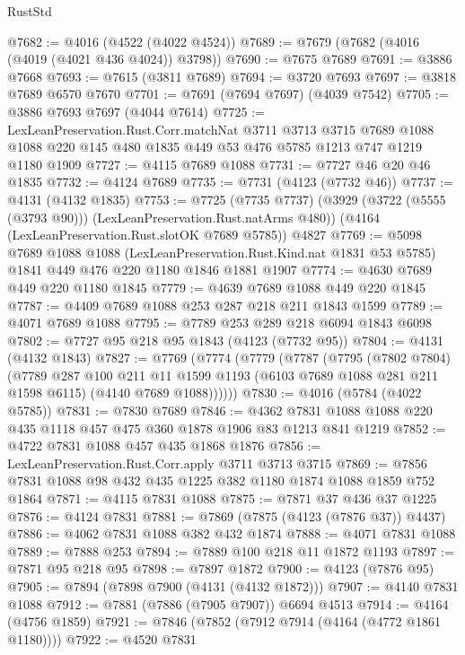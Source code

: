 \begin{lexlean}{RustStd}
\begin{coremodule}
@7682 := @4016 (@4522 (@4022 @4524))
@7689 := @7679 (@7682 (@4016 (@4019 (@4021 @436 @4024)) @3798))
@7690 := @7675 @7689
@7691 := @3886 @7668
@7693 := @7615 (@3811 @7689)
@7694 := @3720 @7693
@7697 := @3818 @7689 @6570 @7670
@7701 := @7691 (@7694 @7697) (@4039 @7542)
@7705 := @3886 @7693 @7697 (@4044 @7614)
@7725 := LexLeanPreservation.Rust.Corr.matchNat
    @3711
    @3713
    @3715
    @7689
    @1088
    @1088
    @220
    @145
    @480
    @1835
    @449
    @53
    @476
    @5785
    @1213
    @747
    @1219
    @1180
    @1909
@7727 := @4115 @7689 @1088
@7731 := @7727 @46 @20 @46 @1835
@7732 := @4124 @7689
@7735 := @7731 (@4123 (@7732 @46))
@7737 := @4131 (@4132 @1835)
@7753 := @7725
    (@7735 @7737)
    (@3929 (@3722 (@5555 (@3793 @90))) (LexLeanPreservation.Rust.natArms @480))
    (@4164 (LexLeanPreservation.Rust.slotOK @7689 @5785))
    @4827
@7769 := @5098
    @7689
    @1088
    @1088
    (LexLeanPreservation.Rust.Kind.nat @1831 @53 @5785)
    @1841
    @449
    @476
    @220
    @1180
    @1846
    @1881
    @1907
@7774 := @4630 @7689 @449 @220 @1180 @1845
@7779 := @4639 @7689 @1088 @449 @220 @1845
@7787 := @4409 @7689 @1088 @253 @287 @218 @211 @1843 @1599
@7789 := @4071 @7689 @1088
@7795 := @7789 @253 @289 @218 @6094 @1843 @6098
@7802 := @7727 @95 @218 @95 @1843 (@4123 (@7732 @95))
@7804 := @4131 (@4132 @1843)
@7827 := @7769
    (@7774
      (@7779
        (@7787
          (@7795
            (@7802 @7804)
            (@7789
              @287
              @100
              @211
              @11
              @1599
              @1193
              (@6103 @7689 @1088 @281 @211 @1598 @6115)
              (@4140 @7689 @1088))))))
@7830 := @4016 (@5784 (@4022 @5785))
@7831 := @7830 @7689
@7846 := @4362 @7831 @1088 @1088 @220 @435 @1118 @457 @475 @360 @1878 @1906 @83 @1213 @841 @1219
@7852 := @4722 @7831 @1088 @457 @435 @1868 @1876
@7856 := LexLeanPreservation.Rust.Corr.apply @3711 @3713 @3715
@7869 := @7856 @7831 @1088 @98 @432 @435 @1225 @382 @1180 @1874 @1088 @1859 @752 @1864
@7871 := @4115 @7831 @1088
@7875 := @7871 @37 @436 @37 @1225
@7876 := @4124 @7831
@7881 := @7869 (@7875 (@4123 (@7876 @37)) @4437)
@7886 := @4062 @7831 @1088 @382 @432 @1874
@7888 := @4071 @7831 @1088
@7889 := @7888 @253
@7894 := @7889 @100 @218 @11 @1872 @1193
@7897 := @7871 @95 @218 @95
@7898 := @7897 @1872
@7900 := @4123 (@7876 @95)
@7905 := @7894 (@7898 @7900 (@4131 (@4132 @1872)))
@7907 := @4140 @7831 @1088
@7912 := @7881 (@7886 (@7905 @7907)) @6694 @4513
@7914 := @4164 (@4756 @1859)
@7921 := @7846 (@7852 (@7912 @7914 (@4164 (@4772 @1861 @1180))))
@7922 := @4520 @7831

\end{coremodule}
\end{lexlean}
